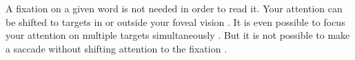 
A fixation on a given word is not needed in order to read it. Your attention can be shifted to targets in or outside your foveal vision \cite{eyeMovement}. It is even possible to focus your attention on multiple targets simultaneously \cite{simAttention}. But it is not possible to make a saccade without shifting attention to the fixation \cite{eyeMovement}.